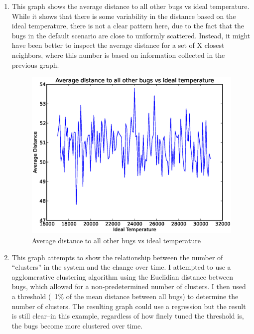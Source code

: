 \documentclass{article}
\begin{document}
\begin{enumerate}
\newpage

\item{} %

This graph shows the average distance to all other bugs vs ideal temperature.
While it shows that there is some variability in the distance based on the
ideal temperature, there is not a clear pattern here, due to the fact that the
bugs in the default scenario are close to uniformly scattered. Instead, it
might have been better to inspect the average distance for a set of X closest
neighbors, where this number is based on information collected in the previous
graph.

\begin{figure}[H]
\centering
\includegraphics[width=\textwidth]{figs/figure_3}
\caption{Average distance to all other bugs vs ideal temperature}
\end{figure}

\newpage

\setcounter{enumi}{6}
\setcounter{figure}{6}

\item{} %

This graph attempts to show the relationship between the number of ``clusters''
in the system and the change over time. I attempted to use a agglomerative
clustering algorithm using the Euclidian distance between bugs, which allowed
for a non-predetermined number of clusters. I then used a threshold (~1\% of
the mean distance between all bugs) to determine the number of clusters. The
resulting graph could use a regression but the result is still clear--in this
example, regardless of how finely tuned the threshold is, the bugs become more
clustered over time.


\end{enumerate}
\end{document}
